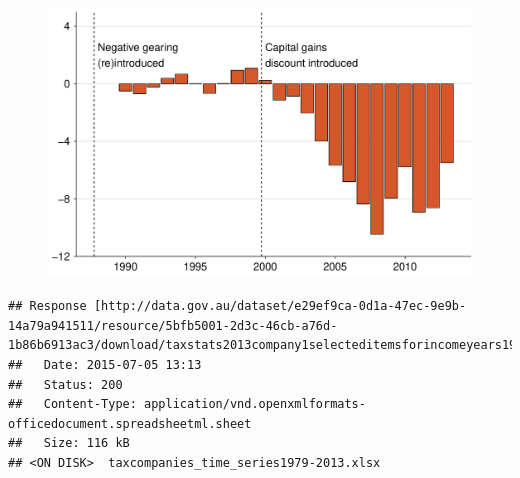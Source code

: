 \documentclass{grattan}\usepackage[]{graphicx}\usepackage[]{color}
\makeatletter
\newenvironment{kframe}{%
 \def\at@end@of@kframe{}%
 \ifinner\ifhmode%
  \def\at@end@of@kframe{\end{minipage}}%
  \begin{minipage}{\columnwidth}%
 \fi\fi%
 \def\FrameCommand##1{\hskip\@totalleftmargin \hskip-\fboxsep
 \colorbox{shadecolor}{##1}\hskip-\fboxsep
     \hskip-\linewidth \hskip-\@totalleftmargin \hskip\columnwidth}%
 \MakeFramed {\advance\hsize-\width
   \@totalleftmargin\z@ \linewidth\hsize
   \@setminipage}}%
 {\par\unskip\endMakeFramed%
 \at@end@of@kframe}
\newenvironment{knitrout}{}{} %
\makeatother
\begin{document}
\begin{figure}[t]
\includegraphics[width=\columnwidth]{figure/Net_rent_over_time-1}

\end{figure}

\begin{knitrout}
\color{fgcolor}\begin{kframe}
\begin{verbatim}
## Response [http://data.gov.au/dataset/e29ef9ca-0d1a-47ec-9e9b-14a79a941511/resource/5bfb5001-2d3c-46cb-a76d-1b86b6913ac3/download/taxstats2013company1selecteditemsforincomeyears197980to201213.xlsx]
##   Date: 2015-07-05 13:13
##   Status: 200
##   Content-Type: application/vnd.openxmlformats-officedocument.spreadsheetml.sheet
##   Size: 116 kB
## <ON DISK>  taxcompanies_time_series1979-2013.xlsx
\end{verbatim}
\end{kframe}
\end{knitrout}
\end{document}
